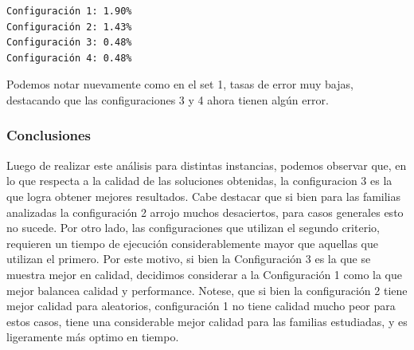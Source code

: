 \begin{verbatim}
Configuración 1: 1.90%
Configuración 2: 1.43%
Configuración 3: 0.48%
Configuración 4: 0.48%
\end{verbatim}

Podemos notar nuevamente como en el set 1, tasas de error muy bajas, destacando que las configuraciones 3 y 4 ahora tienen algún error.

\subsubsection{Conclusiones} 

Luego de realizar este análisis para distintas instancias, podemos observar que, en lo que respecta a la calidad de las soluciones obtenidas, la configuracion 3 es la que logra obtener mejores resultados. Cabe destacar que si bien para las familias analizadas la configuración 2 arrojo muchos desaciertos, para casos generales esto no sucede. Por otro lado, las configuraciones que utilizan el segundo criterio, requieren un tiempo de ejecución considerablemente mayor que aquellas que utilizan el primero.  Por este motivo, si bien la Configuración 3 es la que se muestra mejor en calidad, decidimos considerar a la Configuración 1 como la que mejor balancea calidad y performance. Notese, que si bien la configuración 2 tiene mejor calidad para aleatorios, configuración 1 no tiene calidad mucho peor para estos casos, tiene una considerable mejor calidad para las familias estudiadas, y es ligeramente más optimo en tiempo.